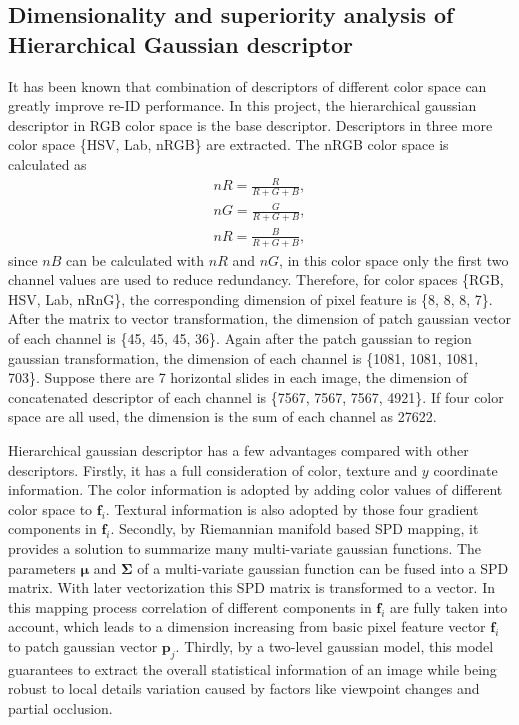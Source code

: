 \subsection{Dimensionality and superiority analysis of Hierarchical Gaussian descriptor}
It has been known that combination of descriptors of different color space can greatly improve re-ID performance. In this project, the hierarchical gaussian descriptor in RGB color space is the base descriptor. Descriptors in three more color space \{HSV, Lab, nRGB\} are extracted. The nRGB color space is calculated as 
\begin{equation}
\begin{aligned}
nR = \frac{R}{R+G+B},\\
nG = \frac{G}{R+G+B},\\
nR = \frac{B}{R+G+B}, 
\end{aligned}
\end{equation}
since $nB$ can be calculated with $nR$ and $nG$, in this color space only the first two channel values are used to reduce redundancy. Therefore, for color spaces \{RGB, HSV, Lab, nRnG\}, the corresponding dimension of pixel feature is \{8, 8, 8, 7\}. After the matrix to vector transformation, the dimension of patch gaussian vector of each channel is \{45, 45, 45, 36\}. Again after the patch gaussian to region gaussian transformation, the dimension of each channel is \{1081, 1081, 1081, 703\}. Suppose there are 7 horizontal slides in each image, the dimension of concatenated descriptor of each channel is \{7567, 7567, 7567, 4921\}. If four color space are all used, the dimension is the sum of each channel as 27622. 

Hierarchical gaussian descriptor has a few advantages compared with other descriptors. Firstly, it has a full consideration of color, texture and $y$ coordinate information. The color information is adopted by adding color values of different color space to $\bm{f}_i$. Textural information is also adopted by those four gradient components in $\bm{f}_i$. Secondly, by Riemannian manifold based SPD mapping, it provides a solution to summarize many multi-variate gaussian functions. The parameters $\bm{\mu}$ and $\bm{\Sigma}$ of a multi-variate gaussian function can be fused into a SPD matrix. With later vectorization this SPD matrix is transformed to a vector. In this mapping process correlation of different components in $\bm{f}_i$ are fully taken into account, which leads to a dimension increasing from basic pixel feature vector $\bm{f}_i$ to patch gaussian vector $\bm{p}_j$. Thirdly, by a two-level gaussian model, this model guarantees to extract the overall statistical information of an image while being robust to local details variation caused by factors like viewpoint changes and partial occlusion. 

